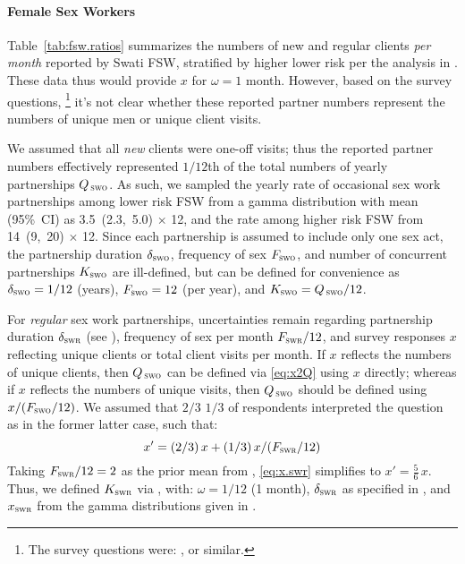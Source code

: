 \paragraph{Female Sex Workers}
Table~\ref{tab:fsw.ratios} summarizes
the numbers of new and regular clients \emph{per month} reported by Swati FSW,
stratified by higher \vs lower risk per the analysis in .
These data thus would provide $x$ for $\omega = 1$ month.
However, based on the survey questions,%
\footnote{The survey questions were: , or similar.}
it's not clear whether these reported partner numbers
represent the numbers of unique men or unique client visits.
\par
We assumed that all \emph{new} clients were one-off visits;
thus the reported partner numbers effectively represented
$1/12$th of the total numbers of yearly partnerships $Q_{\,\textsc{swo}}$.
As such, we sampled the yearly rate of occasional sex work partnerships among lower risk FSW
from a gamma distribution with mean (95\%~CI) as 3.5~(2.3,~5.0) $\times$ 12,
and the rate among higher risk FSW from 14~(9,~20) $\times$ 12.
Since each partnership is assumed to include only one sex act,
the partnership duration $\delta_{\textsc{swo}}$, frequency of sex $F_{\textsc{swo}}$,
and number of concurrent partnerships $K_{\textsc{swo}}$ are ill-defined,
but can be defined for convenience as
$\delta_{\textsc{swo}} = 1/12$ (years), $F_{\textsc{swo}} = 12$ (per year),
and $K_{\textsc{swo}} = Q_{\,\textsc{swo}} / 12$.
\par
For \emph{regular} sex work partnerships, uncertainties remain regarding
partnership duration $\delta_{\textsc{swr}}$ (see ),
frequency of sex per month $F_{\textsc{swr}}/12$, and
survey responses $x$ reflecting unique clients or total client visits per month.
If $x$ reflects the numbers of unique clients, then
$Q_{\,\textsc{swo}}$ can be defined via \eqref{eq:x2Q} using $x$ directly;
whereas if $x$ reflects the numbers of unique visits, then
$Q_{\,\textsc{swo}}$ should be defined using $x/(F_{\textsc{swo}}/12)$.
We assumed that $2/3$ \vs $1/3$ of respondents interpreted the question
as in the former \vs latter case, such that:
\begin{equation}\label{eq:x.swr}
  x' = (2/3)\,x + (1/3)\,x/(F_{\textsc{swr}}/12)
\end{equation}
Taking $F_{\textsc{swr}}/12 = 2$ as the prior mean from ,
\eqref{eq:x.swr} simplifies to $x' = \frac{5}{6}\,x$.
Thus, we defined $K_{\textsc{swr}}$ via , with:
$\omega = 1/12$ (1 month),
$\delta_{\textsc{swr}}$ as specified in , and
$x_{\textsc{swr}}$ from the gamma distributions given in .
